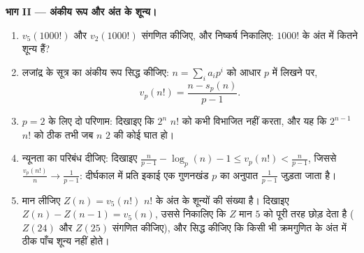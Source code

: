 \begin{problem}
\medskip \noindent\textbf{भाग II --- अंकीय रूप और अंत के शून्य।}
\begin{enumerate}[resume]
  \item $v_5(1000!)$ और $v_2(1000!)$ संगणित कीजिए, और निष्कर्ष निकालिए:
  $1000!$ के अंत में कितने शून्य हैं?
  \item लजांद्र के सूत्र का अंकीय रूप सिद्ध कीजिए: $n = \sum_i a_i p^i$ को
  आधार $p$ में लिखने पर,
        \[
        v_p(n!) = \frac{n - s_p(n)}{p - 1} .
        \]
  \item $p = 2$ के लिए दो परिणाम: दिखाइए कि $2^n$ $n!$ को कभी विभाजित नहीं
  करता, और यह कि $2^{n-1}$ $n!$ को ठीक तभी  जब $n$ $2$ की कोई
  घात हो।
  \item न्यूनता का परिबंध दीजिए: दिखाइए $\frac n{p-1} - \log_p(n) - 1 \leq
  v_p(n!) < \frac n{p-1}$, जिससे $\frac{v_p(n!)}{n} \to \frac1{p-1}$:
  दीर्घकाल में प्रति इकाई एक गुणनखंड $p$ का अनुपात $\frac1{p-1}$ जुड़ता जाता
  है।
  \item मान लीजिए $Z(n) = v_5(n!)$ $n!$ के अंत के शून्यों की संख्या है।
  दिखाइए $Z(n) - Z(n-1) = v_5(n)$, उससे निकालिए कि $Z$ मान $5$ को पूरी तरह
  छोड़ देता है ($Z(24)$ और $Z(25)$ संगणित कीजिए), और सिद्ध कीजिए कि किसी भी
  क्रमगुणित के अंत में ठीक पाँच शून्य नहीं होते।
\end{enumerate}


\end{problem}
